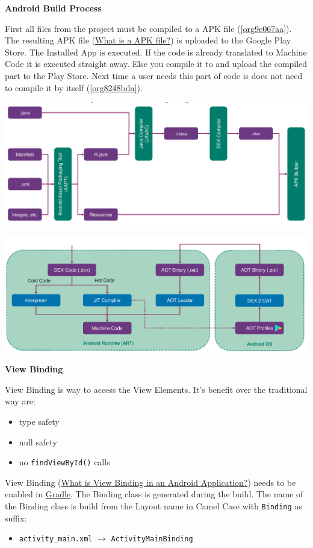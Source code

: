 \documentclass[11pt,twoside,landscape]{article}
\begin{document}
\begin{multicols}{3}
\textbf{Android Build Process}

First all files from the project must be compiled to a APK file (\ref{org9e067aa}).
The resulting APK file (\href{../../../roam/20211109113541-what_is_a_apk_file.org}{What is a APK file?}) is uploaded to the Google Play Store.
The Installed App is executed.
If the code is already translated to Machine Code it is executed straight away.
Else you compile it to and upload the compiled part to the Play Store.
Next time a user needs this part of code is does not need to compile it by itself (\ref{org8248bda}). 

\begin{center}
\includegraphics[width=.9\linewidth]{img/android_build_system_create_apk.png}
\label{org9e067aa}
\end{center}


\begin{center}
\includegraphics[width=.9\linewidth]{img/android_build_system_art_2_0.png}
\label{org8248bda}
\end{center}

\textbf{View Binding}

View Binding is way to access the View Elements. It's benefit over the traditional way are:
\begin{itemize}
\item type safety
\item null safety
\item no \texttt{findViewById()} calls
\end{itemize}


View Binding (\href{../../../roam/20211112094953-what_is_view_binding_in_an_android_application.org}{What is View Binding in an Android Application?}) needs to be enabled in \href{../../../roam/20211112095502-gradle.org}{Gradle}.
The Binding class is generated during the build.
The name of the Binding class is build from the Layout name in Camel Case with \texttt{Binding} as suffix:
\begin{itemize}
\item \texttt{activity\_main.xml} \(\rightarrow\) \texttt{ActivityMainBinding}
\end{itemize}


\end{multicols}
\end{document}
